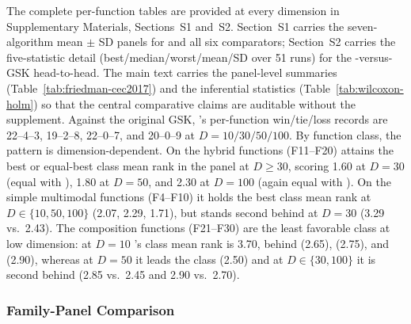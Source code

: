 The complete per-function tables are provided at every dimension in
Supplementary Materials, Sections~S1 and~S2. Section~S1 carries the
seven-algorithm mean $\pm$ SD panels for \dtgsk{} and all six comparators;
Section~S2 carries the five-statistic detail (best/median/worst/mean/SD over 51
runs) for the \dtgsk{}-versus-GSK head-to-head. The main text carries the panel-level summaries
(Table~\ref{tab:friedman-cec2017}) and the inferential statistics
(Table~\ref{tab:wilcoxon-holm}) so that the central comparative
claims are auditable without the supplement.
Against the original GSK, \dtgsk{}'s per-function win/tie/loss
records are 22--4--3, 19--2--8, 22--0--7, and 20--0--9 at
$D = 10/30/50/100$.
By function class, the pattern is dimension-dependent. On the hybrid
functions (F11--F20) \dtgsk{} attains the best or equal-best class
mean rank in the panel at $D \geq 30$, scoring 1.60 at $D = 30$ (equal with
\egsk{}), 1.80 at $D = 50$, and 2.30 at $D = 100$ (again equal with \egsk{}).
On the simple multimodal functions (F4--F10) it holds the best
class mean rank at $D \in \{10, 50, 100\}$ (2.07, 2.29, 1.71), but
stands second behind \egsk{} at $D = 30$ (3.29 vs.\ 2.43).
The composition functions (F21--F30) are the least favorable class at
low dimension: at $D = 10$ \dtgsk{}'s class mean rank is 3.70,
behind \apgsk{} (2.65), \fdbagsk{} (2.75), and \agsk{} (2.90),
whereas at $D = 50$ it leads the class (2.50) and at
$D \in \{30, 100\}$ it is second behind \egsk{} (2.85 vs.\ 2.45 and
2.90 vs.\ 2.70).

\subsubsection{Family-Panel Comparison}\label{sec:exp:cec2017:panel}

